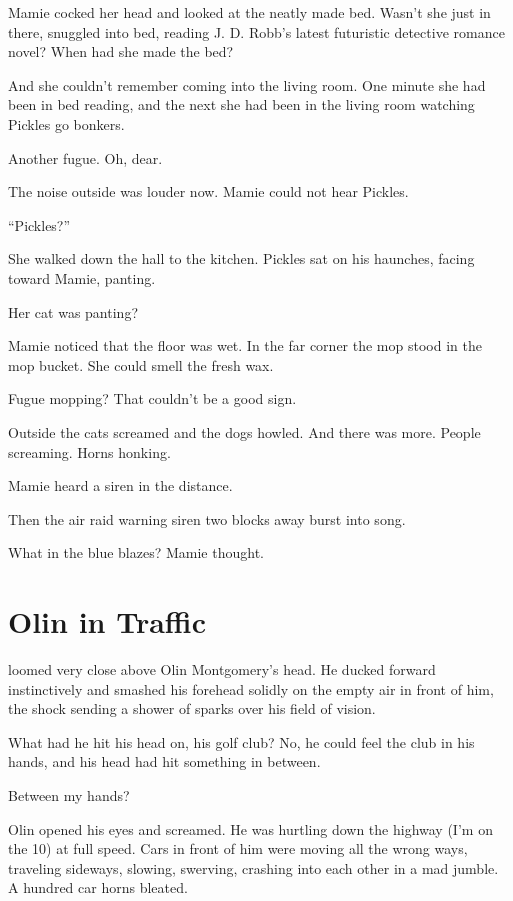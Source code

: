 Mamie cocked her head and looked at the neatly made bed. Wasn't she just in there, snuggled into bed, reading J. D. Robb's latest futuristic detective romance novel? When had she made the bed?

And she couldn't remember coming into the living room. One minute she had been in bed reading, and the next she had been in the living room watching Pickles go bonkers.

Another fugue. Oh, dear.

The noise outside was louder now. Mamie could not hear Pickles.

``Pickles?''

She walked down the hall to the kitchen. Pickles sat on his haunches, facing toward Mamie, panting.

Her cat was panting?

Mamie noticed that the floor was wet. In the far corner the mop stood in the mop bucket. She could smell the fresh wax.

Fugue mopping? That couldn't be a good sign.

Outside the cats screamed and the dogs howled. And there was more. People screaming. Horns honking.

Mamie heard a siren in the distance.

Then the air raid warning siren two blocks away burst into song.

What in the blue blazes? Mamie thought.



\chapter{Olin in Traffic}

 loomed very close above Olin Montgomery's head. He ducked forward instinctively and smashed his forehead solidly on the empty air in front of him, the shock sending a shower of sparks over his field of vision.

What had he hit his head on, his golf club? No, he could feel the club in his hands, and his head had hit something in between.

Between my hands?

Olin opened his eyes and screamed. He was hurtling down the highway (I'm on the 10) at full speed. Cars in front of him were moving all the wrong ways, traveling sideways, slowing, swerving, crashing into each other in a mad jumble. A hundred car horns bleated.

